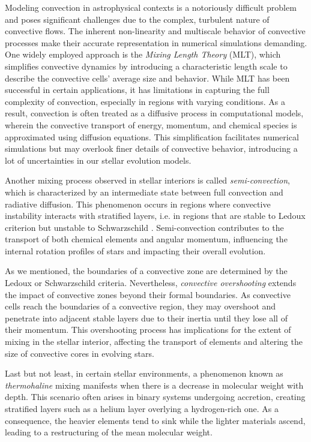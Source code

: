 \documentclass[main.tex]{subfiles}
\begin{document}
    Modeling convection in astrophysical contexts is a notoriously difficult problem and poses significant challenges due to the complex, turbulent nature of convective flows. The inherent non-linearity and multiscale behavior of convective processes make their accurate representation in numerical simulations demanding. One widely employed approach is the \textit{Mixing Length Theory} (MLT), which simplifies convective dynamics by introducing a characteristic length scale to describe the convective cells' average size and behavior. While MLT has been successful in certain applications, it has limitations in capturing the full complexity of convection, especially in regions with varying conditions. As a result, convection is often treated as a diffusive process in computational models, wherein the convective transport of energy, momentum, and chemical species is approximated using diffusion equations. This simplification facilitates numerical simulations but may overlook finer details of convective behavior, introducing a lot of uncertainties in our stellar evolution models.

    Another mixing process observed in stellar interiors is called \textit{semi-convection}, which is characterized by an intermediate state between full convection and radiative diffusion. This phenomenon occurs in regions where convective instability interacts with stratified layers, i.e. in regions that are stable to Ledoux criterion but unstable to Schwarzschild \citep[see][]{spruit:semiconvection}. Semi-convection contributes to the transport of both chemical elements and angular momentum, influencing the internal rotation profiles of stars and impacting their overall evolution.

    As we mentioned, the boundaries of a convective zone are determined by the Ledoux or Schwarzschild criteria. Nevertheless, \textit{convective overshooting} extends the impact of convective zones beyond their formal boundaries. As convective cells reach the boundaries of a convective region, they may overshoot and penetrate into adjacent stable layers due to their inertia until they lose all of their momentum. This overshooting process has implications for the extent of mixing in the stellar interior, affecting the transport of elements and altering the size of convective cores in evolving stars.
    
    Last but not least, in certain stellar environments, a phenomenon known as \textit{thermohaline} mixing manifests when there is a decrease in molecular weight with depth. This scenario often arises in binary systems undergoing accretion, creating stratified layers such as a helium layer overlying a hydrogen-rich one. As a consequence, the heavier elements tend to sink while the lighter materials ascend, leading to a restructuring of the mean molecular weight.
\end{document}

